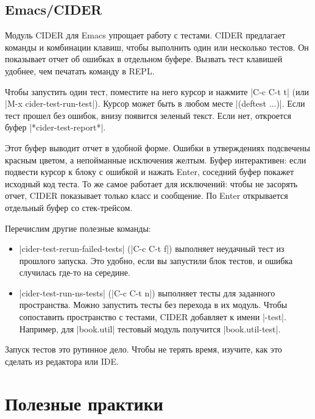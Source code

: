 \subsection{Emacs/CIDER}

Модуль CIDER для Emacs упрощает
работу с тестами. CIDER предлагает команды и комбинации клавиш, чтобы выполнить
один или несколько тестов. Он показывает отчет об ошибках в отдельном
буфере. Вызвать тест клавишей удобнее, чем печатать команду в REPL.

Чтобы запустить один тест, поместите на него курсор и нажмите \spverb|C-c C-t t|
(или \spverb|M-x cider-test-run-test|). Курсор может быть в любом месте
\spverb|(deftest ...)|. Если тест прошел без ошибок, внизу появится зеленый
текст. Если нет, откроется буфер \spverb|*cider-test-report*|.

Этот буфер выводит отчет в удобной форме. Ошибки в утверждениях подсвечены
красным цветом, а непойманные исключения желтым. Буфер интерактивен: если
подвести курсор к блоку с ошибкой и нажать Enter, соседний буфер покажет
исходный код теста. То же самое работает для исключений: чтобы не засорять
отчет, CIDER показывает только класс и сообщение. По Enter открывается отдельный
буфер со стек-трейсом.

Перечислим другие полезные команды:

\begin{itemize}

\item
  \spverb|cider-test-rerun-failed-tests| (\spverb|C-c C-t f|) выполняет
  неудачный тест из прошлого запуска. Это удобно, если вы запустили блок тестов,
  и ошибка случилась где-то на середине.

\item
  \spverb|cider-test-run-ns-tests| (\spverb|C-c C-t n|) выполняет тесты для
  заданного пространства. Можно запустить тесты без перехода в их модуль. Чтобы
  сопоставить пространство с тестами, CIDER добавляет к имени
  \spverb|-test|. Например, для \spverb|book.util| тестовый модуль получится
  \spverb|book.util-test|.

\end{itemize}

Запуск тестов это рутинное дело. Чтобы не терять время, изучите, как это сделать
из редактора или IDE.

\section{Полезные практики}


